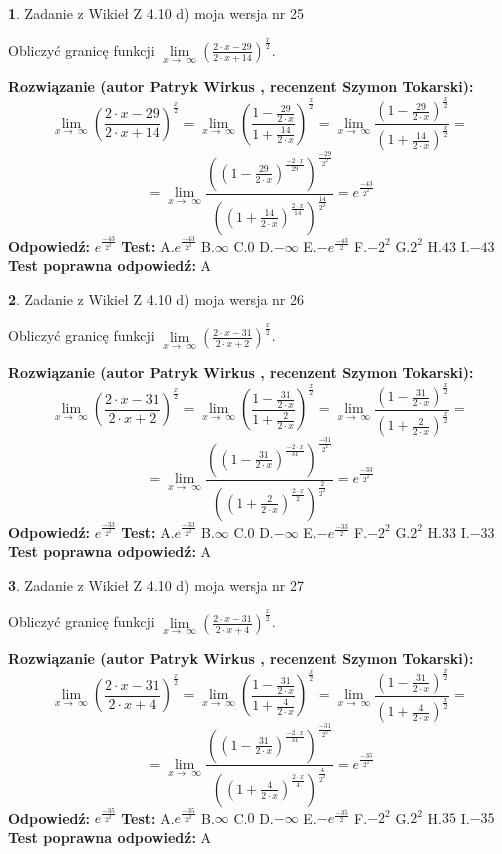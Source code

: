 \documentclass[12pt, a4paper]{article}
\theoremstyle{definition} %
\newtheorem{zad}{}
\newcommand{\zadStart}[1]{\begin{zad}#1\newline}
\newcommand{\zadStop}{\end{zad}}
\newcommand{\rozwStart}[2]{\noindent \textbf{Rozwiązanie (autor #1 , recenzent #2): }\newline}
\newcommand{\rozwStop}{\newline}
\newcommand{\odpStart}{\noindent \textbf{Odpowiedź:}\newline}
\newcommand{\odpStop}{\newline}
\newcommand{\testStart}{\noindent \textbf{Test:}\newline}
\newcommand{\testStop}{\newline}
\newcommand{\kluczStart}{\noindent \textbf{Test poprawna odpowiedź:}\newline}
\newcommand{\kluczStop}{\newline}
\begin{document}
\zadStart{Zadanie z Wikieł Z 4.10 d) moja wersja nr 25}


Obliczyć granicę funkcji  $\lim\limits_{x\to\ \infty}(\frac{2\cdot x-29}{2\cdot x+14})^{\frac{x}{2}}$.
\zadStop
\rozwStart{Patryk Wirkus}{Szymon Tokarski}
$$\lim\limits_{x\to\ \infty}(\frac{2\cdot x-29}{2\cdot x+14})^{\frac{x}{2}} = \lim\limits_{x\to\ \infty}(\frac{1-\frac{29}{2\cdot x}}{1+\frac{14}{2\cdot x}})^{\frac{x}{2}}=\lim\limits_{x\to\ \infty}\frac{(1-\frac{29}{2\cdot x})^{\frac{x}{2}}}{(1+\frac{14}{2\cdot x})^{\frac{x}{2}}}=$$
$$=\lim\limits_{x\to\ \infty}\frac{((1-\frac{29}{2\cdot x})^{\frac{-2\cdot x}{29}})^{\frac{-29}{2^{2}}}}{((1+\frac{14}{2\cdot x})^{\frac{2\cdot x}{14}})^{\frac{14}{2^{2}}}}=e^{\frac{-43}{2^{2}}}$$
\rozwStop
\odpStart
$e^{\frac{-43}{2^{2}}}$
\odpStop
\testStart
A.$e^{\frac{-43}{2^{2}}}$ B.$\infty$ C.$0$ D.$-\infty$ E.$-e^{\frac{-43}{2}}$
F.$-2^{2}$ G.$2^{2}$
H.$43$
I.$-43$
\testStop
\kluczStart
A
\kluczStop



\zadStart{Zadanie z Wikieł Z 4.10 d) moja wersja nr 26}


Obliczyć granicę funkcji  $\lim\limits_{x\to\ \infty}(\frac{2\cdot x-31}{2\cdot x+2})^{\frac{x}{2}}$.
\zadStop
\rozwStart{Patryk Wirkus}{Szymon Tokarski}
$$\lim\limits_{x\to\ \infty}(\frac{2\cdot x-31}{2\cdot x+2})^{\frac{x}{2}} = \lim\limits_{x\to\ \infty}(\frac{1-\frac{31}{2\cdot x}}{1+\frac{2}{2\cdot x}})^{\frac{x}{2}}=\lim\limits_{x\to\ \infty}\frac{(1-\frac{31}{2\cdot x})^{\frac{x}{2}}}{(1+\frac{2}{2\cdot x})^{\frac{x}{2}}}=$$
$$=\lim\limits_{x\to\ \infty}\frac{((1-\frac{31}{2\cdot x})^{\frac{-2\cdot x}{31}})^{\frac{-31}{2^{2}}}}{((1+\frac{2}{2\cdot x})^{\frac{2\cdot x}{2}})^{\frac{2}{2^{2}}}}=e^{\frac{-33}{2^{2}}}$$
\rozwStop
\odpStart
$e^{\frac{-33}{2^{2}}}$
\odpStop
\testStart
A.$e^{\frac{-33}{2^{2}}}$ B.$\infty$ C.$0$ D.$-\infty$ E.$-e^{\frac{-33}{2}}$
F.$-2^{2}$ G.$2^{2}$
H.$33$
I.$-33$
\testStop
\kluczStart
A
\kluczStop



\zadStart{Zadanie z Wikieł Z 4.10 d) moja wersja nr 27}


Obliczyć granicę funkcji  $\lim\limits_{x\to\ \infty}(\frac{2\cdot x-31}{2\cdot x+4})^{\frac{x}{2}}$.
\zadStop
\rozwStart{Patryk Wirkus}{Szymon Tokarski}
$$\lim\limits_{x\to\ \infty}(\frac{2\cdot x-31}{2\cdot x+4})^{\frac{x}{2}} = \lim\limits_{x\to\ \infty}(\frac{1-\frac{31}{2\cdot x}}{1+\frac{4}{2\cdot x}})^{\frac{x}{2}}=\lim\limits_{x\to\ \infty}\frac{(1-\frac{31}{2\cdot x})^{\frac{x}{2}}}{(1+\frac{4}{2\cdot x})^{\frac{x}{2}}}=$$
$$=\lim\limits_{x\to\ \infty}\frac{((1-\frac{31}{2\cdot x})^{\frac{-2\cdot x}{31}})^{\frac{-31}{2^{2}}}}{((1+\frac{4}{2\cdot x})^{\frac{2\cdot x}{4}})^{\frac{4}{2^{2}}}}=e^{\frac{-35}{2^{2}}}$$
\rozwStop
\odpStart
$e^{\frac{-35}{2^{2}}}$
\odpStop
\testStart
A.$e^{\frac{-35}{2^{2}}}$ B.$\infty$ C.$0$ D.$-\infty$ E.$-e^{\frac{-35}{2}}$
F.$-2^{2}$ G.$2^{2}$
H.$35$
I.$-35$
\testStop
\kluczStart
A
\kluczStop
\end{document}
